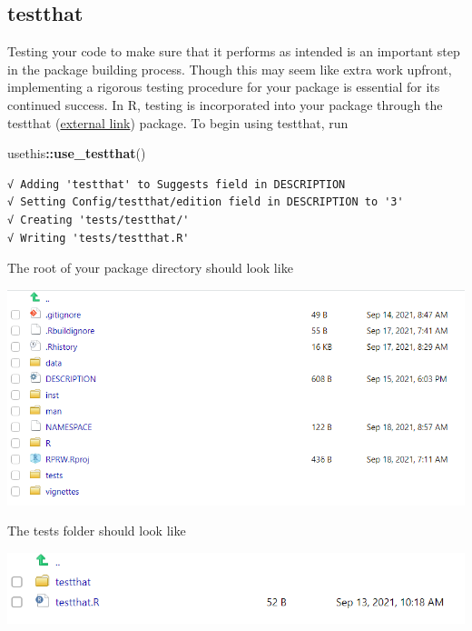 \documentclass[
]{book}
\newenvironment{Shaded}{\begin{snugshade}}{\end{snugshade}}
\newcommand{\KeywordTok}[1]{\textcolor[rgb]{0.13,0.29,0.53}{\textbf{#1}}}
\newcommand{\NormalTok}[1]{#1}
\newcommand{\OperatorTok}[1]{\textcolor[rgb]{0.81,0.36,0.00}{\textbf{#1}}}
\begin{document}
\hypertarget{testthat}{%
\subsection{testthat}\label{testthat}}

Testing your code to make sure that it performs as intended is an important step in the package building process. Though this may seem like extra work upfront, implementing a rigorous testing procedure for your package is essential for its continued success. In R, testing is incorporated into your package through the testthat (\href{https://testthat.r-lib.org/}{external link}) package. To begin using testthat, run

\begin{Shaded}
\begin{Highlighting}[]
\NormalTok{usethis}\OperatorTok{::}\KeywordTok{use_testthat}\NormalTok{()}
\end{Highlighting}
\end{Shaded}

\begin{verbatim}
√ Adding 'testthat' to Suggests field in DESCRIPTION
√ Setting Config/testthat/edition field in DESCRIPTION to '3'
√ Creating 'tests/testthat/'
√ Writing 'tests/testthat.R'
\end{verbatim}

The root of your package directory should look like

\includegraphics[width=1\linewidth]{images/newrpack_files3}

The tests folder should look like

\includegraphics[width=1\linewidth]{images/newrpack_files4}
\end{document}
